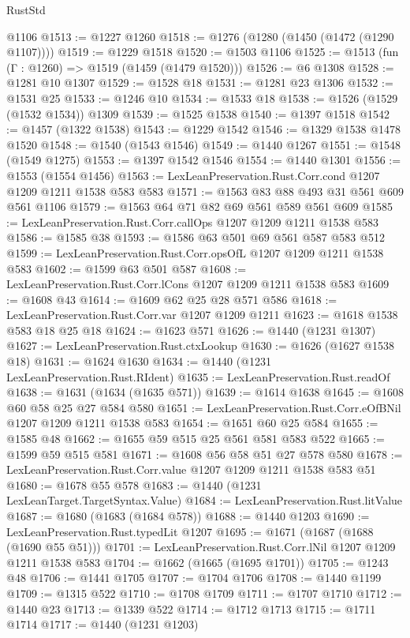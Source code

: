 \begin{lexlean}{RustStd}
\begin{coremodule}
    @1106
@1513 := @1227 @1260
@1518 := @1276 (@1280 (@1450 (@1472 (@1290 @1107))))
@1519 := @1229 @1518
@1520 := @1503 @1106
@1525 := @1513 (fun (Γ : @1260) => @1519 (@1459 (@1479 @1520)))
@1526 := @6 @1308
@1528 := @1281 @10 @1307
@1529 := @1528 @18
@1531 := @1281 @23 @1306
@1532 := @1531 @25
@1533 := @1246 @10
@1534 := @1533 @18
@1538 := @1526 (@1529 (@1532 @1534)) @1309
@1539 := @1525 @1538
@1540 := @1397 @1518
@1542 := @1457 (@1322 @1538)
@1543 := @1229 @1542
@1546 := @1329 @1538 @1478 @1520
@1548 := @1540 (@1543 @1546)
@1549 := @1440 @1267
@1551 := @1548 (@1549 @1275)
@1553 := @1397 @1542 @1546
@1554 := @1440 @1301
@1556 := @1553 (@1554 @1456)
@1563 := LexLeanPreservation.Rust.Corr.cond @1207 @1209 @1211 @1538 @583 @583
@1571 := @1563 @83 @88 @493 @31 @561 @609 @561 @1106
@1579 := @1563 @64 @71 @82 @69 @561 @589 @561 @609
@1585 := LexLeanPreservation.Rust.Corr.callOps @1207 @1209 @1211 @1538 @583
@1586 := @1585 @38
@1593 := @1586 @63 @501 @69 @561 @587 @583 @512
@1599 := LexLeanPreservation.Rust.Corr.opsOfL @1207 @1209 @1211 @1538 @583
@1602 := @1599 @63 @501 @587
@1608 := LexLeanPreservation.Rust.Corr.lCons @1207 @1209 @1211 @1538 @583
@1609 := @1608 @43
@1614 := @1609 @62 @25 @28 @571 @586
@1618 := LexLeanPreservation.Rust.Corr.var @1207 @1209 @1211
@1623 := @1618 @1538 @583 @18 @25 @18
@1624 := @1623 @571
@1626 := @1440 (@1231 @1307)
@1627 := LexLeanPreservation.Rust.ctxLookup
@1630 := @1626 (@1627 @1538 @18)
@1631 := @1624 @1630
@1634 := @1440 (@1231 LexLeanPreservation.Rust.RIdent)
@1635 := LexLeanPreservation.Rust.readOf
@1638 := @1631 (@1634 (@1635 @571))
@1639 := @1614 @1638
@1645 := @1608 @60 @58 @25 @27 @584 @580
@1651 := LexLeanPreservation.Rust.Corr.eOfBNil @1207 @1209 @1211 @1538 @583
@1654 := @1651 @60 @25 @584
@1655 := @1585 @48
@1662 := @1655 @59 @515 @25 @561 @581 @583 @522
@1665 := @1599 @59 @515 @581
@1671 := @1608 @56 @58 @51 @27 @578 @580
@1678 := LexLeanPreservation.Rust.Corr.value @1207 @1209 @1211 @1538 @583 @51
@1680 := @1678 @55 @578
@1683 := @1440 (@1231 LexLeanTarget.TargetSyntax.Value)
@1684 := LexLeanPreservation.Rust.litValue
@1687 := @1680 (@1683 (@1684 @578))
@1688 := @1440 @1203
@1690 := LexLeanPreservation.Rust.typedLit @1207
@1695 := @1671 (@1687 (@1688 (@1690 @55 @51)))
@1701 := LexLeanPreservation.Rust.Corr.lNil @1207 @1209 @1211 @1538 @583
@1704 := @1662 (@1665 (@1695 @1701))
@1705 := @1243 @48
@1706 := @1441 @1705
@1707 := @1704 @1706
@1708 := @1440 @1199
@1709 := @1315 @522
@1710 := @1708 @1709
@1711 := @1707 @1710
@1712 := @1440 @23
@1713 := @1339 @522
@1714 := @1712 @1713
@1715 := @1711 @1714
@1717 := @1440 (@1231 @1203)

\end{coremodule}
\end{lexlean}
